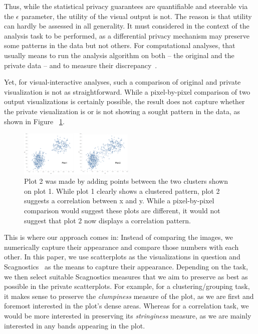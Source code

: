\documentclass[journal]{vgtc}                     %
\begin{document}
Thus, while the statistical privacy guarantees are quantifiable and steerable via the $\epsilon$ parameter, the utility of the visual output is not.
The reason is that utility can hardly be assessed in all generality. It must considered in the context of the analysis task to be performed, as a differential privacy mechanism may preserve some patterns in the data but not others.
For computational analyses, that usually means to run the analysis algorithm on both -- the original and the private data -- and to measure their discrepancy~\cite{Karr2006}.


Yet, for visual-interactive analyses, such a comparison of original and private visualization is not as straightforward.
While a pixel-by-pixel comparison of two output visualizations is certainly possible, the result does not capture whether the private visualization is or is not showing a sought pattern in the data, as shown in Figure ~\ref{fig:pixel_by_pixel_is_meh}.

\begin{figure}[h]
  \centering
    \includegraphics[width=0.49\textwidth]{figs/pixel_by_pixel_is_meh.png}
  
  \caption{Plot 2 was made by adding points between the two clusters shown on plot 1. While plot 1 clearly shows a clustered pattern, plot 2 suggests a correlation between x and y. While a pixel-by-pixel comparison would suggest these plots are different, it would not suggest that plot 2 now displays a correlation pattern. }
  \label{fig:pixel_by_pixel_is_meh}
\end{figure}

This is where our approach comes in: Instead of comparing the images, we numerically capture their appearance and compare those numbers with each other.
In this paper, we use scatterplots as the visualizations in question and Scagnostics~\cite{Wilkinson2005} as the means to capture their appearance.
Depending on the task, we then select suitable Scagnostics measures that we aim to preserve as best as possible in the private scatterplots.
For example, for a clustering/grouping task, it makes sense to preserve the \emph{clumpiness} measure of the plot, as we are first and foremost interested in the plot's dense areas.
Whereas for a correlation task, we would be more interested in preserving its \emph{stringiness} measure, as we are mainly interested in any bands appearing in the plot.
\end{document}

